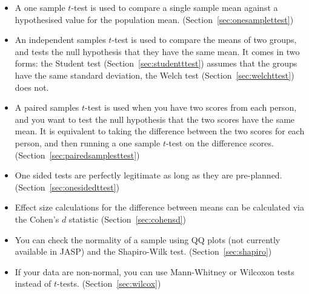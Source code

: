 \begin{itemize} \itemsep -2pt
\item A one sample $t$-test is used to compare a single sample mean against a hypothesised value for the population mean. (Section~\ref{sec:onesamplettest})
\item An independent samples $t$-test is used to compare the means of two groups, and tests the null hypothesis that they have the same mean. It comes in two forms: the Student test (Section~\ref{sec:studentttest}) assumes that the groups have the same standard deviation, the Welch test (Section~\ref{sec:welchttest}) does not.
\item A paired samples $t$-test is used when you have two scores from each person, and you want to test the null hypothesis that the two scores have the same mean. It is equivalent to taking the difference between the two scores for each person, and then running a one sample $t$-test on the difference scores. (Section~\ref{sec:pairedsamplesttest})
\item One sided tests are perfectly legitimate as long as they are pre-planned. (Section~\ref{sec:onesidedttest})
\item Effect size calculations for the difference between means can be calculated via the Cohen's $d$ statistic (Section~\ref{sec:cohensd})
\item You can check the normality of a sample using QQ plots (not currently available in JASP) and the Shapiro-Wilk test. (Section~\ref{sec:shapiro})
\item If your data are non-normal, you can use Mann-Whitney or Wilcoxon tests instead of $t$-tests. (Section~\ref{sec:wilcox})
\end{itemize}








